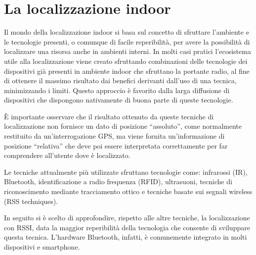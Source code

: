 \section{La localizzazione indoor}
Il mondo della localizzazione indoor si basa sul concetto di sfruttare l'ambiente e le tecnologie presenti, o comunque di facile reperibilità, per avere la possibilità di localizzare una risorsa anche in ambienti interni. In molti casi pratici l'ecosistema utile alla localizzazione viene creato sfruttando combinazioni delle tecnologie dei dispositivi già presenti in ambiente indoor che sfruttano la portante radio, al fine di ottenere il massimo risultato dai benefici derivanti dall'uso di una tecnica, minimizzando i limiti. Questo approccio è favorito dalla larga diffusione di dispositivi che dispongono nativamente di buona parte di queste tecnologie.

È importante osservare che il risultato ottenuto da queste tecniche di localizzazione non fornisce un dato di posizione ``assoluto'', come normalmente restituito da un'interrogazione GPS, ma viene fornita un’informazione di posizione ``relativa'' che deve poi essere interpretata correttamente per far comprendere all'utente dove è localizzato.

Le tecniche attualmente più utilizzate sfruttano tecnologie come: infrarossi (IR), Bluetooth, identificazione a radio frequenza (RFID), ultrasuoni, tecniche di riconoscimento mediante tracciamento ottico e tecniche basate sui segnali wireless (RSS techniques).

In seguito si è scelto di approfondire, rispetto alle altre tecniche, la localizzazione con RSSI, data la maggior reperibilità della tecnologia che consente di sviluppare questa tecnica. L'hardware Bluetooth, infatti, è comunemente integrato in molti dispositivi e smartphone.
